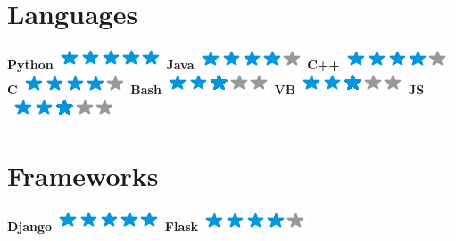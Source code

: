 \begin{aside}
    ~
    ~
    ~
    ~
    ~
    ~
    ~
    ~
    ~
    ~
    ~
    ~
    ~
    ~
    \section{Languages}
    \textbf{Python}\includegraphics[scale=0.40]{img/5stars.png}
    \textbf{Java}\includegraphics[scale=0.40]{img/4stars.png}
    \textbf{C++}\includegraphics[scale=0.40]{img/4stars.png}
    \textbf{C}\includegraphics[scale=0.40]{img/4stars.png}
    \textbf{Bash}\includegraphics[scale=0.40]{img/3stars.png}
    \textbf{VB}\includegraphics[scale=0.40]{img/3stars.png}
    \textbf{JS}\includegraphics[scale=0.40]{img/3stars.png}
    ~
    ~
    ~
    ~
    ~
    ~
    ~
    \section{Frameworks}
    \textbf{Django}\includegraphics[scale=0.40]{img/5stars.png}
    \textbf{Flask}\includegraphics[scale=0.40]{img/4stars.png}
    ~
    ~
    ~
    ~
    ~
    ~
    ~
\end{aside}
